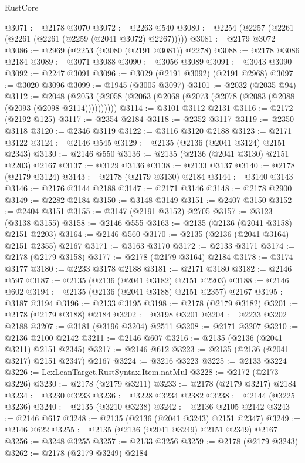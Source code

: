 \begin{lexlean}{RustCore}
\begin{coremodule}
@3071 := @2178 @3070
@3072 := @2263 @540
@3080 := @2254 (@2257 (@2261 (@2261 (@2261 (@2259 (@2041 @3072) @2267)))))
@3081 := @2179 @3072
@3086 := @2969 (@2253 (@3080 (@2191 @3081)) @2278)
@3088 := @2178 @3086 @2184
@3089 := @3071 @3088
@3090 := @3056 @3089
@3091 := @3043 @3090
@3092 := @2247 @3091
@3096 := @3029 (@2191 @3092) (@2191 @2968)
@3097 := @3020 @3096
@3099 := @1945 (@3005 @3097)
@3101 := @2032 (@2035 @94)
@3112 := @2048 (@2053 (@2058 (@2063 (@2068 (@2073 (@2078 (@2083 (@2088 (@2093 (@2098 @2114))))))))))
@3114 := @3101 @3112 @2131
@3116 := @2172 (@2192 @125)
@3117 := @2354 @2184
@3118 := @2352 @3117
@3119 := @2350 @3118
@3120 := @2346 @3119
@3122 := @3116 @3120 @2188
@3123 := @2171 @3122
@3124 := @2146 @545
@3129 := @2135 (@2136 (@2041 @3124) @2151 @2343)
@3130 := @2146 @550
@3136 := @2135 (@2136 (@2041 @3130) @2151 @2203) @2167
@3137 := @3129 @3136
@3138 := @2133 @3137
@3140 := @2178 (@2179 @3124)
@3143 := @2178 (@2179 @3130) @2184
@3144 := @3140 @3143
@3146 := @2176 @3144 @2188
@3147 := @2171 @3146
@3148 := @2178 @2900
@3149 := @2282 @2184
@3150 := @3148 @3149
@3151 := @2407 @3150
@3152 := @2404 @3151
@3155 := @3147 (@2191 @3152) @2705
@3157 := @3123 (@3138 @3155)
@3158 := @2146 @555
@3163 := @2135 (@2136 (@2041 @3158) @2151 @2203)
@3164 := @2146 @560
@3170 := @2135 (@2136 (@2041 @3164) @2151 @2355) @2167
@3171 := @3163 @3170
@3172 := @2133 @3171
@3174 := @2178 (@2179 @3158)
@3177 := @2178 (@2179 @3164) @2184
@3178 := @3174 @3177
@3180 := @2233 @3178 @2188
@3181 := @2171 @3180
@3182 := @2146 @597
@3187 := @2135 (@2136 (@2041 @3182) @2151 @2203)
@3188 := @2146 @602
@3194 := @2135 (@2136 (@2041 @3188) @2151 @2357) @2167
@3195 := @3187 @3194
@3196 := @2133 @3195
@3198 := @2178 (@2179 @3182)
@3201 := @2178 (@2179 @3188) @2184
@3202 := @3198 @3201
@3204 := @2233 @3202 @2188
@3207 := @3181 (@3196 @3204) @2511
@3208 := @2171 @3207
@3210 := @2136 @2100 @2142
@3211 := @2146 @607
@3216 := @2135 (@2136 (@2041 @3211) @2151 @2345)
@3217 := @2146 @612
@3223 := @2135 (@2136 (@2041 @3217) @2151 @2347) @2167
@3224 := @3216 @3223
@3225 := @2133 @3224
@3226 := LexLeanTarget.RustSyntax.Item.natMul
@3228 := @2172 (@2173 @3226)
@3230 := @2178 (@2179 @3211)
@3233 := @2178 (@2179 @3217) @2184
@3234 := @3230 @3233
@3236 := @3228 @3234 @2382
@3238 := @2144 (@3225 @3236)
@3240 := @2135 (@3210 @3238)
@3242 := @2136 @2105 @2142
@3243 := @2146 @617
@3248 := @2135 (@2136 (@2041 @3243) @2151 @2347)
@3249 := @2146 @622
@3255 := @2135 (@2136 (@2041 @3249) @2151 @2349) @2167
@3256 := @3248 @3255
@3257 := @2133 @3256
@3259 := @2178 (@2179 @3243)
@3262 := @2178 (@2179 @3249) @2184

\end{coremodule}
\end{lexlean}
